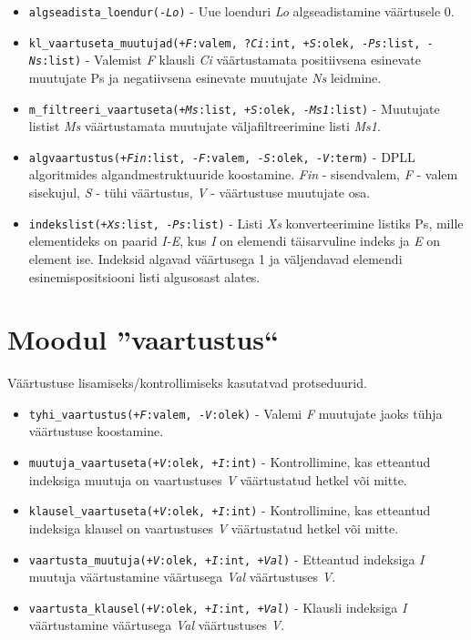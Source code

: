 \begin{itemize}
\item {\tt algseadista\_loendur(-{\it Lo})} - Uue loenduri {\it Lo} algseadistamine väärtusele 0.

\item {\tt kl\_vaartuseta\_muutujad(+{\it F}:valem, ?{\it Ci}:int, +{\it S}:olek, -{\it Ps}:list, -{\it Ns}:list)} - Valemist {\it F} klausli {\it Ci} väärtustamata positiivsena esinevate muutujate Ps
ja negatiivsena esinevate muutujate {\it Ns} leidmine.

\item {\tt m\_filtreeri\_vaartuseta(+{\it Ms}:list, +{\it S}:olek, -{\it Ms1}:list)} - Muutujate listist {\it Ms} väärtustamata muutujate väljafiltreerimine
listi {\it Ms1}.

\item {\tt algvaartustus(+{\it Fin}:list, -{\it F}:valem, -{\it S}:olek, -{\it V}:term)} - DPLL algoritmides algandmestruktuuride koostamine.
{\it Fin} - sisendvalem, {\it F} - valem sisekujul, {\it S} - tühi väärtustus,
{\it V} - väärtustuse muutujate osa.

\item {\tt indekslist(+{\it Xs}:list, -{\it Ps}:list)} - Listi {\it Xs} konverteerimine listiks Ps, mille elementideks
on paarid {\it I-E}, kus {\it I} on elemendi täisarvuline indeks
ja {\it E} on element ise. Indeksid algavad väärtusega 1 ja väljendavad
elemendi esinemispositsiooni listi algusosast alates.

\end{itemize}

\section{Moodul ''vaartustus``}

Väärtustuse lisamiseks/kontrollimiseks kasutatvad protseduurid.

\begin{itemize}
\item {\tt tyhi\_vaartustus(+{\it F}:valem, -{\it V}:olek)} - Valemi {\it F} muutujate jaoks tühja väärtustuse koostamine.

\item {\tt muutuja\_vaartuseta(+{\it V}:olek, +{\it I}:int)} - Kontrollimine, kas etteantud indeksiga muutuja
on vaartustuses {\it V} väärtustatud hetkel või mitte.

\item {\tt klausel\_vaartuseta(+{\it V}:olek, +{\it I}:int)} - Kontrollimine, kas etteantud indeksiga klausel
on vaartustuses {\it V} väärtustatud hetkel või mitte.

\item {\tt vaartusta\_muutuja(+{\it V}:olek, +{\it I}:int, +{\it Val})} - Etteantud indeksiga {\it I} muutuja väärtustamine
väärtusega {\it Val} väärtustuses {\it V}.

\item {\tt vaartusta\_klausel(+{\it V}:olek, +{\it I}:int, +{\it Val})} - Klausli indeksiga {\it I} väärtustamine
väärtusega {\it Val} väärtustuses {\it V}.

\end{itemize}

